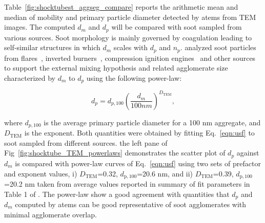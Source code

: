 Table~\ref{fig:shocktubest_aggseg_compare} reports the arithmetic mean and median of mobility and primary particle diameter detected by atems from TEM images. The computed $d_m$ and $d_p$ will be compared with soot sampled from various sources. Soot morphology is mainly governed by coagulation leading to self-similar structures in which $d_m$ scales with $d_p$ and $n_p$. 
\citet{olfert2019universal} analyzed soot particles from flares~\citep{kazemimanesh2019size}, inverted burners~\citep{dastanpour2017variation}, compression ignition engines~\citep{graves2015characterization} and other sources to support the external mixing hypothesis and related agglomerate size characterized by $d_m$ to $d_p$ using the following power-law:

\begin{equation}
	d_{p} = d_{p,100} 
	\left(
	\frac{d_m}{100 nm}
	\right)^{D_{\mathrm{TEM}}},
	\label{eqn:usf}
\end{equation}

\noindent where $d_{p,100}$ is the average primary particle diameter for a 100 nm aggregate, and $D_{\mathrm{TEM}}$ is the exponent. Both quantities were obtained by fitting Eq.~\eqref{eqn:usf} to soot sampled from different sources. the left pane of Fig~\ref{fig:shocktube_TEM_powerlaws} demonstrates the scatter plot of $d_p$ against $d_m$ is compared with power-law curves of Eq.~\eqref{eqn:usf} using two sets of prefactor and exponent values, i) $D_{\mathrm{TEM}}$=0.32, $d_{\mathrm{p,100}}$=20.6 nm, and ii) $D_{\mathrm{TEM}}$=0.39, $d_{\mathrm{p,100}}$=20.2 nm taken from average values reported in summary of fit parameters in Table 1 of \citet{olfert2019universal}. The power-law show a good agreement with quantities that $d_p$ and $d_m$ computed by atems can be good representative of soot agglomerates with minimal agglomerate overlap.

